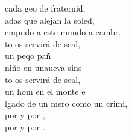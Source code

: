 \begin{cancion}
	cada geo de fraternid,\\
	adas que alejan la soled,\\
	empudo a este mundo a cambr.\\
	to os servirá de seal, \\
	un peqo pañ  \\
	niño en unaueva sins\\
	to os servirá de seal, \\
	un hom en el monte e \\
	lgado de un mero como un crimi,\\
	por  y por , \\
	por  y por .  \\
\end{cancion}%
